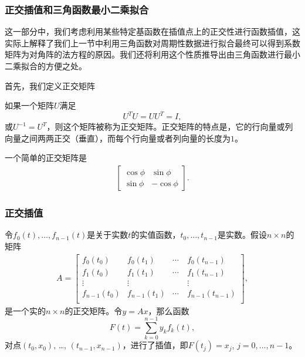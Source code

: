 \documentclass[10pt]{beamer}
\begin{document}
\begin{frame}
\frametitle{正交插值和三角函数最小二乘拟合}
这一部分中，我们考虑利用某些特定基函数在插值点上的正交性进行函数插值，这实际上解释了我们上一节中利用三角函数对周期性数据进行拟合最终可以得到系数矩阵为对角阵的法方程的原因。我们还将利用这个性质推导出由三角函数进行最小二乘拟合的方便之处。

\vspace{0.2cm}

首先，我们定义正交矩阵
\begin{definition}[正交矩阵]
如果一个矩阵$U$满足
\begin{equation}
U^T U = U U^T = I,
\end{equation}
或$U^{-1} = U^T$，则这个矩阵被称为正交矩阵。正交矩阵的特点是，它的行向量或列向量之间两两正交（垂直），而每个行向量或者列向量的长度为$1$。
\end{definition}
一个简单的正交矩阵是
\begin{align*}
 \left[ \begin{array}{cc}
     \cos \phi    & \sin \phi   \\
     \sin \phi   &  -\cos \phi                   
            \end{array} \right] .
\end{align*}
\end{frame}


\begin{frame}
\frametitle{正交插值}
\begin{theorem}[正交插值定理]
\label{thm: orthogonal interp 1}
令$f_0(t), \ldots, f_{n-1}(t)$是关于实数$t$的实值函数，$t_0, \ldots, t_{n-1}$是实数。假设$n \times n$的矩阵
\begin{align}
A = \left[ \begin{array}{cccc}
     f_0(t_0)    & f_0(t_1) & \cdots  & f_0(t_{n-1})  \\
     f_1(t_0)    & f_1(t_1) & \cdots  & f_1(t_{n-1})  \\
     \vdots       & \vdots   &  \quad  & \vdots  \\
     f_{n-1}(t_0)    & f_{n-1}(t_1) & \cdots  & f_{n-1}(t_{n-1})  \\                
            \end{array} \right] ,
\end{align}
是一个实的$n \times n$的正交矩阵。令$y = Ax$，那么函数
\begin{equation}
F(t) = \sum_{k = 0}^{n-1} y_k f_k(t),
\end{equation}
对点$(t_0, x_0)$, \ldots, $(t_{n-1}, x_{n-1})$，进行了插值，即$F(t_j) = x_j$, $j = 0, \ldots, n-1$。
\end{theorem}
\end{frame}
\end{document}
